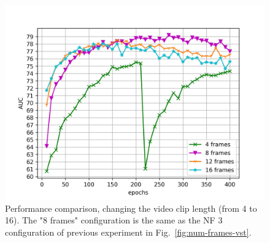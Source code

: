 \begin{figure}[t]
\centering
	\includegraphics[trim=0 0 0 0, clip, width=1.\linewidth]{images/exp_3.jpg}
	\caption{Performance comparison, changing the video clip length (from 4 to 16). The "8 frames" configuration is the same as the NF 3 configuration of previous experiment in Fig.~\ref{fig:num-frames-vst}.}
	\label{fig:random-batch}
\end{figure}

